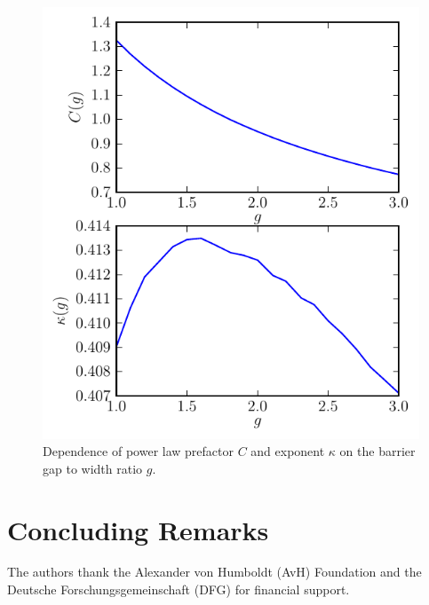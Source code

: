 \documentclass[twocolumn,superscriptaddress]{revtex4}
\begin{document}
\begin{figure}[H]
\includegraphics[width= .5 \textwidth]{plots/powerlaw_parameters.pdf}
\caption{Dependence of power law prefactor $C$ and exponent $\kappa$ on the barrier gap to width ratio $g$. }
\label{fig6}
\end{figure}



\section{Concluding Remarks}

\acknowledgments
The authors thank the Alexander von Humboldt (AvH) Foundation and the Deutsche Forschungsgemeinschaft (DFG) 
for financial support. 


\end{document}
